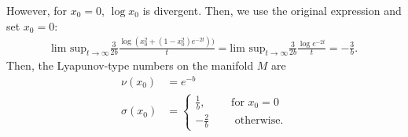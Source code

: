 \begin{solution}[9.4]
However, for $x_0=0$, $\log x_0$ is divergent. Then, we use the original expression and set $x_0=0$:
\begin{align}
\text{lim sup}_{t\to \infty} \frac{3}{2b}\frac{\log(x_0^2 + (1-x_0^2)e^{-2t}))}{t} = \text{lim sup}_{t\to \infty} \frac{3}{2b}\frac{\log e^{-2t}}{t} = -\frac{3}{b}.
\end{align}
Then, the Lyapunov-type numbers on the manifold $M$ are
\begin{align}
    \nu(x_0) &= e^{-b} \\
    \sigma(x_0) &= \begin{cases} \frac{1}{b}, \qquad \text{ for } x_0 = 0 \\
                    -\frac{2}{b} \qquad \text{ otherwise}.
    \end{cases}
\end{align}

\end{solution}
